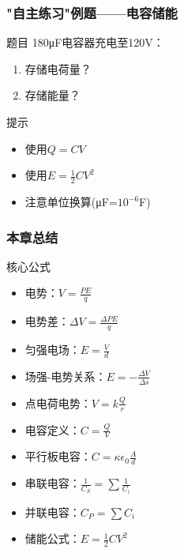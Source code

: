 \documentclass{beamer}
\begin{document}
\begin{frame}
    \frametitle{"自主练习"例题——电容储能}
    
    \begin{block}{题目}
        180μF电容器充电至120V：
        \begin{enumerate}
            \item 存储电荷量？
            \item 存储能量？
        \end{enumerate}
    \end{block}
    
    \begin{block}{提示}
        \begin{itemize}
            \item 使用$Q = CV$
            \item 使用$E = \frac{1}{2}CV^2$
            \item 注意单位换算(μF=$10^{-6}$F)
        \end{itemize}
    \end{block}
\end{frame}

\begin{frame}
    \frametitle{本章总结}
    
    \begin{block}{核心公式}
        \begin{itemize}
            \item 电势：$V = \frac{PE}{q}$
            \item 电势差：$\Delta V = \frac{\Delta PE}{q}$
            \item 匀强电场：$E = \frac{V}{d}$
            \item 场强-电势关系：$E = -\frac{\Delta V}{\Delta s}$
            \item 点电荷电势：$V = k\frac{Q}{r}$
            \item 电容定义：$C = \frac{Q}{V}$
            \item 平行板电容：$C = \kappa\epsilon_0 \frac{A}{d}$
            \item 串联电容：$\frac{1}{C_S} = \sum \frac{1}{C_i}$
            \item 并联电容：$C_P = \sum C_i$
            \item 储能公式：$E = \frac{1}{2}CV^2$
        \end{itemize}
    \end{block}
\end{frame}
\end{document}
